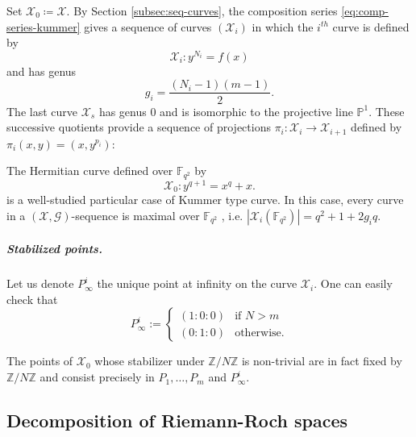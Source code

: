 \documentclass[a4paper,USenglish,autoref]{lipics-v2021}
\newcommand\F{\mathbb{F}}
\newcommand\PP{\mathbb{P}}
\newcommand\Z{\mathbb{Z}}
\renewcommand{\vec}[1]{\boldsymbol{#1}}
\newcommand{\size}[1]{\left|#1\right|}
\newcommand\calX{\mathcal{X}}
\newcommand\calG{\mathcal{G}}
\newcommand\XGseq{(\calX, \vec{\calG})}
\newcommand\mydef{\coloneqq}
\begin{document}
Set $\calX_0\mydef \calX$. By Section \ref{subsec:seq-curves}, the composition series \eqref{eq:comp-series-kummer} gives a sequence of curves $(\calX_i)$ in which the $i^{th}$ curve is defined by
\begin{equation}\label{Crvi}
	\calX_i : y^{N_i}=f(x)
\end{equation}
and has genus
\[g_i=\frac{(N_i-1)(m-1)}{2}.\]
The last curve $\calX_{s}$ has genus 0 and is isomorphic to the projective line $\PP^1$. These successive quotients provide a sequence of projections $\pi_i: \calX_i \rightarrow \calX_{i+1}$ defined by ${\pi_i(x,y)=(x,y^{p_i})}$:

\begin{center}
\end{center} 

\begin{example}\label{ex:hermitian} 
	The Hermitian curve defined over $\F_{q^2}$ by
	\begin{equation}\label{eq:hermitian}
		\calX_0 : y^{q+1} = x^q+x.
	\end{equation}
	is a well-studied particular case of Kummer type curve. In this case, every curve in a $\XGseq$-sequence is maximal over $\F_{q^2}$ \cite[Proposition 6]{L87}, i.e. $\size{\calX_i(\F_{q^2})}=q^2+1+2g_iq$. 
\end{example}

\subparagraph*{Stabilized points.}

Let us denote $P^i_\infty$ the unique point at infinity on the curve $\calX_i$. One can easily check that 
\[P_\infty^i:=\left\{\begin{array}{cl}
	(1:0:0) &\text{if } N > m \\
	(0:1:0) & \text{otherwise.}
\end{array}\right.\]
%

The points of $\calX_0$ whose stabilizer under $\Z/N\Z$ is non-trivial are in fact fixed by $\Z/N\Z$ and consist precisely in $P_1,\dots,P_m$ and $P_\infty^i$.

\subsection{Decomposition of Riemann-Roch spaces}
\end{document}
